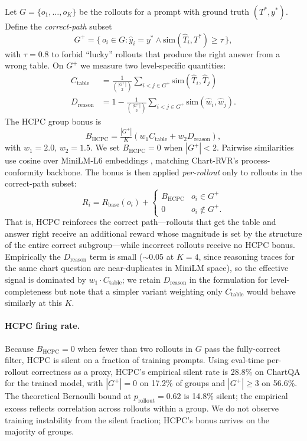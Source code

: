 \documentclass[11pt]{article}
\begin{document}
Let $G=\{o_1,\dots,o_K\}$ be the rollouts for a prompt with ground
truth $(T^*, y^*)$. Define the \emph{correct-path} subset
\[
G^+ = \{\,o_i\in G : \hat y_i = y^*
\wedge \mathrm{sim}(\hat T_i, T^*) \ge \tau\,\},
\]
with $\tau{=}0.8$ to forbid ``lucky'' rollouts that produce the right
answer from a wrong table. On $G^+$ we measure two level-specific
quantities:
\begin{align*}
C_{\text{table}} &= \tfrac{1}{\binom{|G^+|}{2}}\!\!\sum_{i<j\in G^+}\!\!
  \mathrm{sim}(\hat T_i, \hat T_j)\\
D_{\text{reason}} &= 1 - \tfrac{1}{\binom{|G^+|}{2}}\!\!\sum_{i<j\in G^+}\!\!
  \mathrm{sim}(\hat w_i, \hat w_j).
\end{align*}
The HCPC group bonus is
\[
B_{\text{HCPC}} \!=\! \tfrac{|G^+|}{K}\!
\left(w_1 C_{\text{table}} + w_2 D_{\text{reason}}\right),
\]
with $w_1{=}2.0,\,w_2{=}1.5$. We set
$B_{\text{HCPC}}{=}0$ when $|G^+|{<}2$. Pairwise similarities use
cosine over MiniLM-L6 embeddings \citep{minilm}, matching Chart-RVR's
process-conformity backbone. The bonus is then applied
\emph{per-rollout} only to rollouts in the correct-path subset:
\[
R_i = R_{\text{base}}(o_i) +
\begin{cases}
B_{\text{HCPC}} & o_i \in G^+\\
0 & o_i \notin G^+.
\end{cases}
\]
That is, HCPC reinforces the correct path---rollouts that get the
table and answer right receive an additional reward whose magnitude
is set by the structure of the entire correct subgroup---while
incorrect rollouts receive no HCPC bonus.
Empirically the $D_{\text{reason}}$ term is small ($\sim$0.05 at
$K{=}4$, since reasoning traces for the same chart question are
near-duplicates in MiniLM space), so the effective signal is dominated
by $w_1 \cdot C_{\text{table}}$; we retain $D_{\text{reason}}$ in the
formulation for level-completeness but note that a simpler variant
weighting only $C_{\text{table}}$ would behave similarly at this $K$.

\paragraph{HCPC firing rate.} Because $B_{\text{HCPC}}{=}0$ when fewer
than two rollouts in $G$ pass the fully-correct filter, HCPC is silent
on a fraction of training prompts. Using eval-time per-rollout
correctness as a proxy, HCPC's empirical silent rate is 28.8\% on
ChartQA for the trained model, with $|G^+|{=}0$ on 17.2\% of groups
and $|G^+|{\geq}3$ on 56.6\%. The theoretical Bernoulli bound at
$p_{\text{rollout}}{=}0.62$ is 14.8\% silent; the empirical excess
reflects correlation across rollouts within a group. We do not
observe training instability from the silent fraction; HCPC's bonus
arrives on the majority of groups.
\end{document}
